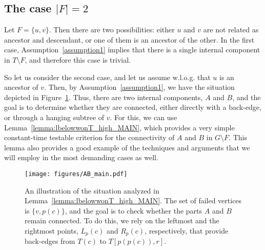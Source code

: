 \documentclass[11pt,a4paper]{article}
\begin{document}
\subsection{The case $|F|=2$}
\label{section:f=2}

Let $F=\{u,v\}$. Then there are two possibilities: either $u$ and $v$ are not related as ancestor and descendant, or one of them is an ancestor of the other. In the first case, Assumption~\ref{assumption1} implies that there is a single internal component in $T\setminus F$, and therefore this case is trivial.

So let us consider the second case, and let us assume w.l.o.g. that $u$ is an ancestor of $v$. Then, by Assumption~\ref{assumption1}, we have the situation depicted in Figure~\ref{figure:AB_MAIN}. Thus, there are two internal components, $A$ and $B$, and the goal is to determine whether they are connected, either directly with a back-edge, or through a hanging subtree of $v$. For this, we can use Lemma~\ref{lemma:lbelowwonT_high_MAIN}, which provides a very simple constant-time testable criterion for the connectivity of $A$ and $B$ in $G\setminus F$. This lemma also provides a good example of the techniques and arguments that we will employ in the most demanding cases as well. 

\begin{figure}[h!]\centering
\texttt{[image: figures/AB\_main.pdf]}
\caption{\small{An illustration of the situation analyzed in Lemma~\ref{lemma:lbelowwonT_high_MAIN}. The set of failed vertices is $\{v,p(c)\}$, and the goal is to check whether the parts $A$ and $B$ remain connected. To do this, we rely on the leftmost and the rightmost points, $L_p(c)$ and $R_p(c)$, respectively, that provide back-edges from $T(c)$ to $T[p(p(c)),r]$.}}\label{figure:AB_MAIN}
\end{figure}
\end{document}
